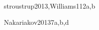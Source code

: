 \begin{syllabus}
\begin{unit}{\PLEventDrivenandReactiveProgramming}{}{stroustrup2013,Williams11}{2}{a,b}
\begin{topics}
	\item \PLEventDrivenandReactiveProgrammingTopicEvents
	\item \PLEventDrivenandReactiveProgrammingTopicCanonical
	\item \PLEventDrivenandReactiveProgrammingTopicUsingA
	\item \PLEventDrivenandReactiveProgrammingTopicExternally
	\item \PLEventDrivenandReactiveProgrammingTopicSeparation
\end{topics}

\begin{learningoutcomes}
	\item \PLEventDrivenandReactiveProgrammingLOWriteEvent [\Usage]
	\item \PLEventDrivenandReactiveProgrammingLOExplainWhyDriven [\Usage]
	\item \PLEventDrivenandReactiveProgrammingLODescribeAn [\Usage]
\end{learningoutcomes}
\end{unit}

\begin{unit}{\DSGraphsandTrees}{}{Nakariakov2013}{7}{a,b,d}
\begin{topics}
	\item \DSGraphsandTreesTopicTrees 
	\item \DSGraphsandTreesTopicUndirected
	\item \DSGraphsandTreesTopicDirected
	\item \DSGraphsandTreesTopicWeighted
	\item \DSGraphsandTreesTopicSpanning
	\item \DSGraphsandTreesTopicGraph
\end{topics}

\begin{learningoutcomes}
	\item \DSGraphsandTreesLOIllustrate [\Usage]
	\item \DSGraphsandTreesLODemonstrateDifferent [\Usage]
	\item \DSGraphsandTreesLOModel [\Usage]
	\item \DSGraphsandTreesLOShowHow [\Usage]
	\item \DSGraphsandTreesLOExplainHowA [\Usage]
	\item \DSGraphsandTreesLODetermineIf [\Usage]
\end{learningoutcomes}
\end{unit}


\end{syllabus}
